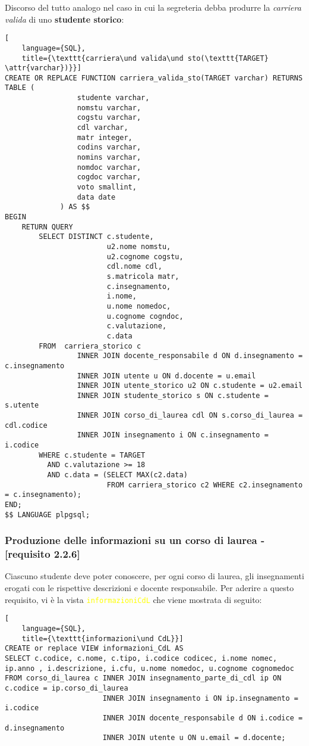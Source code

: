 \documentclass{article}
\newcommand{\attr}[1]{\texttt{\textcolor{gray}{#1}}}
\newcommand{\sqlview}[1]{\texttt{\textcolor{yellow}{#1}}}
\newcommand{\und}[0]{\textunderscore}
\begin{document}
Discorso del tutto analogo nel caso in cui la segreteria debba produrre la \textit{carriera valida} di uno \textbf{studente storico}:

\begin{lstlisting}[
    language={SQL},
    title={\texttt{carriera\und valida\und sto(\texttt{TARGET} \attr{varchar})}}]
CREATE OR REPLACE FUNCTION carriera_valida_sto(TARGET varchar) RETURNS TABLE (
                 studente varchar,
                 nomstu varchar,
                 cogstu varchar,
                 cdl varchar,
                 matr integer,
                 codins varchar,
                 nomins varchar,
                 nomdoc varchar,
                 cogdoc varchar,
                 voto smallint,
                 data date
             ) AS $$
BEGIN
    RETURN QUERY
        SELECT DISTINCT c.studente,
                        u2.nome nomstu,
                        u2.cognome cogstu,
                        cdl.nome cdl,
                        s.matricola matr,
                        c.insegnamento,
                        i.nome,
                        u.nome nomedoc,
                        u.cognome cogndoc,
                        c.valutazione,
                        c.data
        FROM  carriera_storico c
                 INNER JOIN docente_responsabile d ON d.insegnamento = c.insegnamento
                 INNER JOIN utente u ON d.docente = u.email
                 INNER JOIN utente_storico u2 ON c.studente = u2.email
                 INNER JOIN studente_storico s ON c.studente = s.utente
                 INNER JOIN corso_di_laurea cdl ON s.corso_di_laurea = cdl.codice
                 INNER JOIN insegnamento i ON c.insegnamento = i.codice
        WHERE c.studente = TARGET
          AND c.valutazione >= 18
          AND c.data = (SELECT MAX(c2.data)
                        FROM carriera_storico c2 WHERE c2.insegnamento = c.insegnamento);
END;
$$ LANGUAGE plpgsql;
\end{lstlisting}

\pagebreak

\subsubsection{Produzione delle informazioni su un corso di laurea - [requisito 2.2.6]}
Ciascuno studente deve poter conoscere, per ogni corso di laurea, gli insegnamenti erogati con le rispettive descrizioni e docente responsabile. Per aderire a questo requisito, vi è la vista \sqlview{informazioni\und CdL} che viene mostrata di seguito:
\begin{lstlisting}[
    language={SQL},
    title={\texttt{informazioni\und CdL}}]
CREATE or replace VIEW informazioni_CdL AS
SELECT c.codice, c.nome, c.tipo, i.codice codicec, i.nome nomec, ip.anno , i.descrizione, i.cfu, u.nome nomedoc, u.cognome cognomedoc
FROM corso_di_laurea c INNER JOIN insegnamento_parte_di_cdl ip ON c.codice = ip.corso_di_laurea
                       INNER JOIN insegnamento i ON ip.insegnamento = i.codice
                       INNER JOIN docente_responsabile d ON i.codice = d.insegnamento
                       INNER JOIN utente u ON u.email = d.docente;
\end{lstlisting}
\end{document}
